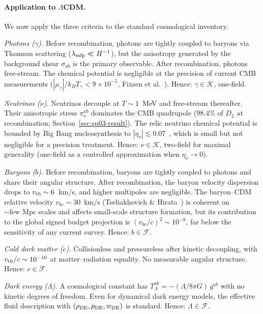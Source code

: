 \paragraph{Application to $\Lambda$CDM.}

We now apply the three criteria to the standard cosmological
inventory.

\emph{Photons ($\gamma$).}  Before recombination, photons
are tightly coupled to baryons via Thomson scattering
($\lambda_{\rm mfp} \ll H^{-1}$), but the anisotropy
generated by the background shear $\sigma_{ab}$ is the
primary observable.  After recombination, photons
free-stream.  The chemical potential is negligible at the
precision of current CMB measurements ($|\mu_\gamma| /
k_B T_\gamma < 9 \times 10^{-5}$,
Fixsen et al.~\cite{Fixsen1996}).
Hence: $\gamma \in \mathcal{K}$, one-field.

\emph{Neutrinos ($\nu$).}  Neutrinos decouple at
$T \sim 1$~MeV and free-stream thereafter.  Their
anisotropic stress $\pi_\nu^{ab}$ dominates the CMB
quadrupole ($98.4\%$ of $D_2$ at recombination;
Section~\ref{sec:sp03-result}).  The relic neutrino
chemical potential is bounded by Big Bang nucleosynthesis
to $|\eta_\nu| \lesssim 0.07$~\cite{Mangano2012}, which
is small but not negligible for a precision treatment.
Hence: $\nu \in \mathcal{K}$, two-field for maximal
generality (one-field as a controlled approximation when
$\eta_\nu \to 0$).

\emph{Baryons ($b$).}  Before recombination, baryons are
tightly coupled to photons and share their angular
structure.  After recombination, the baryon velocity
dispersion drops to $v_{\rm th} \sim 6$~km/s,
and higher multipoles are negligible.  The baryon--CDM
relative velocity $v_{bc} \sim 30$~km/s
(Tseliakhovich \& Hirata~\cite{TseliakhovichHirata2010})
is coherent on $\sim\!\text{few Mpc}$ scales and affects
small-scale structure formation, but its contribution to
the global signed budget projection is
$(v_{bc}/c)^2 \sim 10^{-8}$, far below the sensitivity
of any current survey.  Hence: $b \in \mathcal{F}$.

\emph{Cold dark matter ($c$).}  Collisionless and
pressureless after kinetic decoupling, with
$v_{\rm th}/c \sim 10^{-10}$ at matter--radiation
equality.  No measurable angular structure.
Hence: $c \in \mathcal{F}$.

\emph{Dark energy ($\Lambda$).}  A cosmological constant
has $T^{ab}_\Lambda = -(\Lambda/8\pi G)\,g^{ab}$ with no
kinetic degrees of freedom.  Even for dynamical dark
energy models, the effective fluid description with
$(\rho_{\rm DE}, p_{\rm DE}, w_{\rm DE})$ is standard.
Hence: $\Lambda \in \mathcal{F}$.


